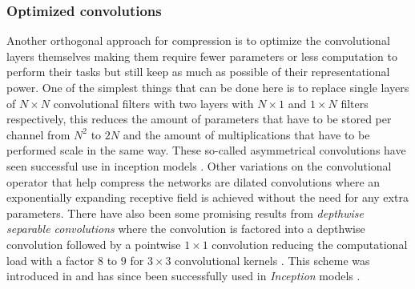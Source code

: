 \documentclass{kththesis}
\newcommand{\bibentry}[1]{\parencite{#1}}
\begin{document}
\subsubsection{Optimized convolutions}
Another orthogonal approach for compression is to optimize the convolutional
layers themselves making them require fewer parameters or less computation to
perform their tasks but still keep as much as possible of their representational
power. One of the simplest things that can be done here is to replace single
layers of \(N \times N\) convolutional filters with two layers with \(N \times
1\) and \(1 \times N\) filters respectively, this reduces the amount of
parameters that have to be stored per channel from \(N^2\) to \(2N\) and the
amount of multiplications that have to be performed scale in the same way. These
so-called asymmetrical convolutions have seen successful use in inception models
\bibentry{szegedy2016rethinking}.  
Other variations on the convolutional operator that help compress the networks
are dilated convolutions \bibentry{yu2015multi} where an exponentially expanding
receptive field is achieved without the need for any extra parameters. There
have also been some promising results from \emph{depthwise separable
  convolutions} where the convolution is factored into a depthwise convolution
followed by a pointwise \(1 \times 1\) convolution reducing the computational
load with a factor \(8\) to \(9\) for \(3 \times 3\) convolutional kernels
\bibentry{howard2017mobilenets}. This scheme was introduced in
\bibentry{sifre2014rigid} and has since been successfully used in
\emph{Inception} models \bibentry{ioffe2015batch}.  
\end{document}

